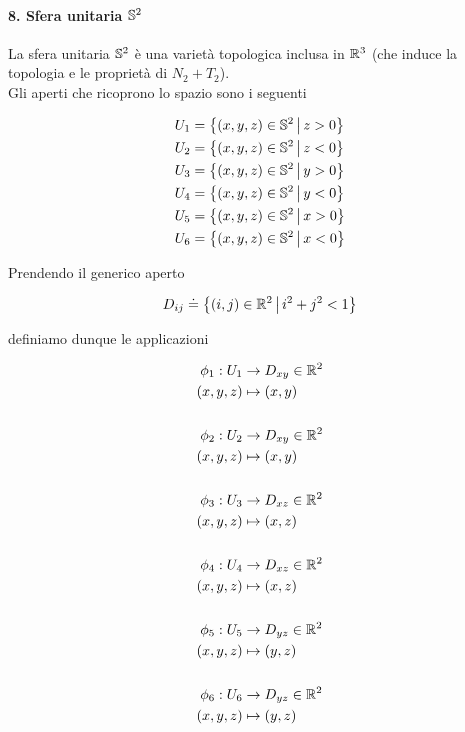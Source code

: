 \paragraph{8. Sfera unitaria $ \S^{2} $}

La sfera unitaria $ \S^{2} $ è una varietà topologica inclusa in $ \R^{3} $ (che induce la topologia e le proprietà di $ N_{2}+T_{2} $).\\
Gli aperti che ricoprono lo spazio sono i seguenti

\begin{align}
	\begin{split}
		U_{1} &= \left\{ (x,y,z) \in \S^{2} \, \middle| \, z>0 \right\}\\
		U_{2} &= \left\{ (x,y,z) \in \S^{2} \, \middle| \, z<0 \right\}\\
		U_{3} &= \left\{ (x,y,z) \in \S^{2} \, \middle| \, y>0 \right\}\\
		U_{4} &= \left\{ (x,y,z) \in \S^{2} \, \middle| \, y<0 \right\}\\
		U_{5} &= \left\{ (x,y,z) \in \S^{2} \, \middle| \, x>0 \right\}\\
		U_{6} &= \left\{ (x,y,z) \in \S^{2} \, \middle| \, x<0 \right\}
	\end{split}	
\end{align}

Prendendo il generico aperto

\begin{equation}
	D_{ij} \doteq \left\{ (i,j) \in \R^{2} \, \middle| \, i^{2}+j^{2}<1 \right\}
\end{equation}

definiamo dunque le applicazioni

\begin{align}
	\begin{split}
		\phi_{1} : U_{1} &\to D_{xy} \in \R^{2}\\
		(x,y,z) &\mapsto (x,y)\\\\
		\phi_{2} : U_{2} &\to D_{xy} \in \R^{2}\\
		(x,y,z) &\mapsto (x,y)\\\\
		\phi_{3} : U_{3} &\to D_{xz} \in \R^{2}\\
		(x,y,z) &\mapsto (x,z)\\\\
		\phi_{4} : U_{4} &\to D_{xz} \in \R^{2}\\
		(x,y,z) &\mapsto (x,z)\\\\
		\phi_{5} : U_{5} &\to D_{yz} \in \R^{2}\\
		(x,y,z) &\mapsto (y,z)\\\\
		\phi_{6} : U_{6} &\to D_{yz} \in \R^{2}\\
		(x,y,z) &\mapsto (y,z)
	\end{split}
\end{align}

